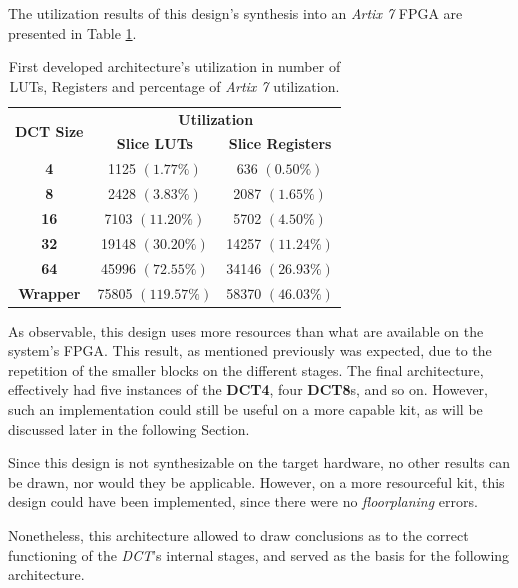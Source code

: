The utilization results of this design's synthesis into an \emph{Artix 7} FPGA are presented in Table \ref{tab:v1results}. 

\begin{table}[!htpb]
    \centering
    \begin{tabular}{ccc} \toprule
        \multirow{2}{*}{\textbf{DCT Size}} &     \multicolumn{2}{c}{\textbf{Utilization}} \\
         &      \textbf{Slice LUTs} &      \textbf{Slice Registers} \\ \toprule
        \textbf{4} &    1125 $(1.77\%)$ &       636 $(0.50\%)$ \\ \hline
        \textbf{8} &    2428 $(3.83\%)$ &       2087 $(1.65\%)$ \\ \hline
        \textbf{16} &   7103 $(11.20\%)$ &      5702 $(4.50\%)$ \\ \hline
        \textbf{32} &   19148 $(30.20\%)$ &     14257 $(11.24\%)$  \\ \hline
        \textbf{64} &   45996 $(72.55\%)$  &    34146 $(26.93\%)$  \\ \bottomrule        
        \textbf{Wrapper} & 75805 $(119.57\%)$ & 58370 $(46.03\%)$ \\
        \bottomrule
    \end{tabular}
    \caption{First developed architecture's utilization in number of LUTs, Registers and percentage of \emph{Artix 7} utilization.}
    \label{tab:v1results}
\end{table}

As observable, this design uses more resources than what are available on the system's FPGA. This result, as mentioned previously was expected, due to the repetition of the smaller blocks on the different stages. The final architecture, effectively had five instances of the \textbf{DCT4}, four \textbf{DCT8}s, and so on. However, such an implementation could still be useful on a more capable kit, as will be discussed later in the following Section.

Since this design is not synthesizable on the target hardware, no other results can be drawn, nor would they be applicable. However, on a more resourceful kit, this design could have been implemented, since there were no \emph{\gls{floorplaning}} errors.

Nonetheless, this architecture allowed to draw conclusions as to the correct functioning of the \emph{DCT}'s internal stages, and served as the basis for the following architecture.

